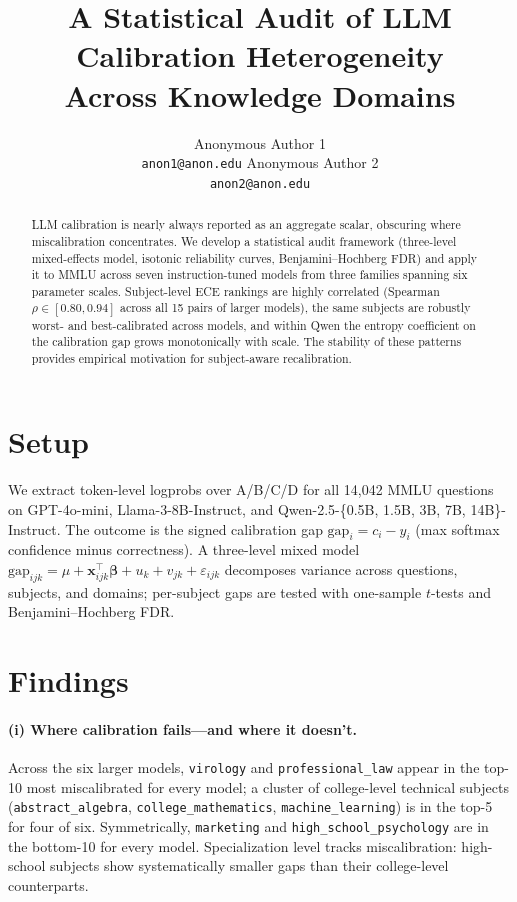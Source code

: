 \documentclass{article}
\title{A Statistical Audit of LLM Calibration Heterogeneity\\Across Knowledge Domains}
\author{%
  Anonymous Author 1 \\
  \texttt{anon1@anon.edu}
  \And
  Anonymous Author 2 \\
  \texttt{anon2@anon.edu}
}
\begin{document}
\maketitle

\begin{abstract}
LLM calibration is nearly always reported as an aggregate scalar, obscuring
where miscalibration concentrates. We develop a statistical audit framework
(three-level mixed-effects model, isotonic reliability curves,
Benjamini--Hochberg FDR) and apply it to MMLU across seven instruction-tuned
models from three families spanning six parameter scales. Subject-level ECE
rankings are highly correlated (Spearman $\rho \in [0.80, 0.94]$ across all
15 pairs of larger models), the same subjects are robustly worst- and
best-calibrated across models, and within Qwen the entropy coefficient on
the calibration gap grows monotonically with scale. The stability of these
patterns provides empirical motivation for subject-aware recalibration.
\end{abstract}

\section{Setup}
We extract token-level logprobs over A/B/C/D for all 14{,}042 MMLU
questions on GPT-4o-mini, Llama-3-8B-Instruct, and
Qwen-2.5-\{0.5B, 1.5B, 3B, 7B, 14B\}-Instruct. The outcome is the signed
calibration gap $\mathrm{gap}_i = c_i - y_i$ (max softmax confidence minus
correctness). A three-level mixed model
$\mathrm{gap}_{ijk} = \mu + \mathbf{x}_{ijk}^\top\boldsymbol{\beta}
+ u_k + v_{jk} + \varepsilon_{ijk}$ decomposes variance across questions,
subjects, and domains; per-subject gaps are tested with one-sample $t$-tests
and Benjamini--Hochberg FDR.

\section{Findings}

\paragraph{(i) Where calibration fails---and where it doesn't.}
Across the six larger models, \texttt{virology} and \texttt{professional\_law}
appear in the top-10 most miscalibrated for every model; a cluster of
college-level technical subjects (\texttt{abstract\_algebra},
\texttt{college\_mathematics}, \texttt{machine\_learning}) is in the top-5 for
four of six. Symmetrically, \texttt{marketing} and
\texttt{high\_school\_psychology} are in the bottom-10 for every model.
Specialization level tracks miscalibration: high-school subjects show
systematically smaller gaps than their college-level counterparts.
\end{document}
